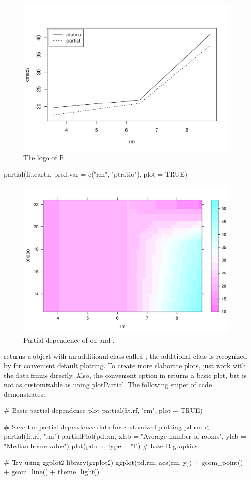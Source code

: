\begin{figure}[htbp]
  \centering
  \includegraphics[width=0.8\linewidth]{plotmo_vs_partial}
  \caption{The logo of R.}
  \label{figure:plotmo_vs_partial}
\end{figure}

\begin{example}
partial(fit.earth, pred.var = c("rm", "ptratio"), plot = TRUE)
\end{example}

\begin{figure}[htbp]
  \centering
  \includegraphics[width=0.8\linewidth]{earth_rm_ptratio}
  \caption{Partial dependence of  on  and .}
  \label{figure:earth_rm_ptratio}
\end{figure}

 returns a object with an additioanl class called ; the additional class is recognized by  for convenient default plotting. To create more elaborate plots, just work with the data frame directly. Also, the convenient  option in  returns a basic plot, but is not as customizable as uning plotPartial. The following snipet of code demonstrates:
\begin{example}
# Basic partial dependence plot
partial(fit.rf, "rm", plot = TRUE)

# Save the partial dependence data for customized plotting
pd.rm <- partial(fit.rf, "rm")
partialPlot(pd.rm, xlab = "Average number of rooms", ylab = "Median home value")
plot(pd.rm, type = "l")  # base R graphics

# Try using ggplot2
library(ggplot2)
ggplot(pd.rm, aes(rm, y)) +
  geom_point() +
  geom_line() +
  theme_light()
\end{example}

